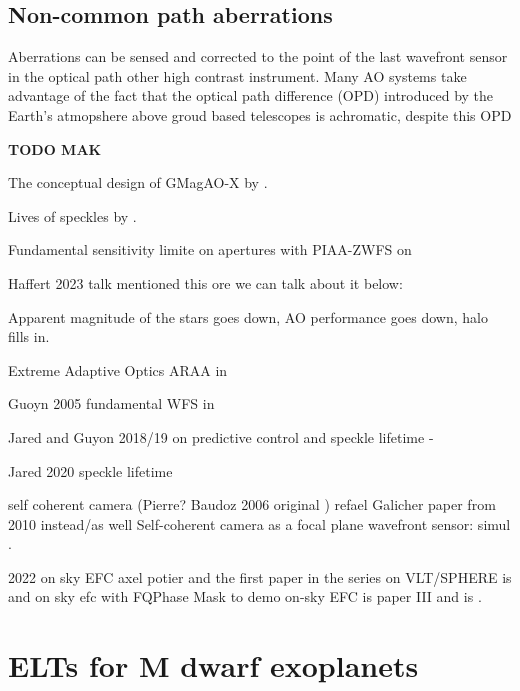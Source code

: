\documentclass[letterpaper]{ar-1col}
\begin{document}
\subsection{Non-common path aberrations}

Aberrations can be sensed and corrected to the point of the last wavefront sensor in the optical path other high contrast instrument.
%
Many AO systems take advantage of the fact that the optical path difference (OPD) introduced by the Earth's atmopshere above groud based telescopes is achromatic, despite this OPD
 
{\bf TODO MAK}


The conceptual design of GMagAO-X by \citet{Males22}.

Lives of speckles by \citet{Males21}.


Fundamental sensitivity limite on apertures with PIAA-ZWFS on \citet{Haffert23}

Haffert 2023 talk mentioned this ore we can talk about it below:


Apparent magnitude of the stars goes down, AO performance goes down, halo fills in.

Extreme Adaptive Optics ARAA in \citet{Guyon18}

Guoyn 2005 fundamental WFS in \citet{Guyon05-1}

Jared and Guyon 2018/19 on predictive control and speckle lifetime - \citep{Males18}


Jared 2020 speckle lifetime \citep{Males21}

self coherent camera (Pierre? Baudoz 2006 original \citep{Baudoz06}) refael Galicher paper from 2010 instead/as well Self-coherent camera as a focal plane wavefront sensor: simul \citep{Galicher10}.




2022 on sky EFC axel potier \citep{Potier22} and the first paper in the series on VLT/SPHERE is \citep{Potier20} and on sky efc with FQPhase Mask to demo on-sky EFC is paper III and is \citet{Galicher24}.




\section{ELTs for M dwarf exoplanets}
\end{document}
